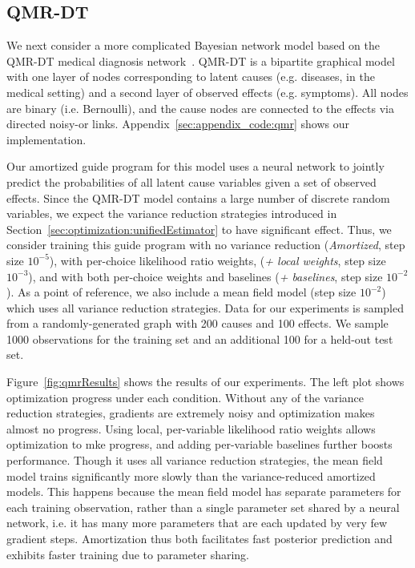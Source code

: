 \subsection{QMR-DT}
\label{sec:results_qmr}

We next consider a more complicated Bayesian network model based on the QMR-DT medical diagnosis network~\cite{QMR}. QMR-DT is a bipartite graphical model with one layer of nodes corresponding to latent causes (e.g. diseases, in the medical setting) and a second layer of observed effects (e.g. symptoms). All nodes are binary (i.e. Bernoulli), and the cause nodes are connected to the effects via directed noisy-or links. Appendix~\ref{sec:appendix_code:qmr} shows our implementation.

Our amortized guide program for this model uses a neural network to jointly predict the probabilities of all latent cause variables given a set of observed effects. Since the QMR-DT model contains a large number of discrete random variables, we expect the variance reduction strategies introduced in Section~\ref{sec:optimization:unifiedEstimator} to have significant effect.
Thus, we consider training this guide program with no variance reduction (\emph{Amortized}, step size $10^{-5}$), with per-choice likelihood ratio weights, (\emph{+ local weights}, step size $10^{-3}$), and with both per-choice weights and baselines (\emph{+ baselines}, step size $10^{-2}$). As a point of reference, we also include a mean field model (step size $10^{-2}$) which uses all variance reduction strategies.
Data for our experiments is sampled from a randomly-generated graph with 200 causes and 100 effects. We sample 1000 observations for the training set and an additional 100 for a held-out test set.

Figure~\ref{fig:qmrResults} shows the results of our experiments. The left plot shows optimization progress under each condition. Without any of the variance reduction strategies, gradients are extremely noisy and optimization makes almost no progress. Using local, per-variable likelihood ratio weights allows optimization to mke progress, and adding per-variable baselines further boosts performance. Though it uses all variance reduction strategies, the mean field model trains significantly more slowly than the variance-reduced amortized models. This happens because the mean field model has separate parameters for each training observation, rather than a single parameter set shared by a neural network, i.e. it has many more parameters that are each updated by very few gradient steps. Amortization thus both facilitates fast posterior prediction and exhibits faster training due to parameter sharing.

